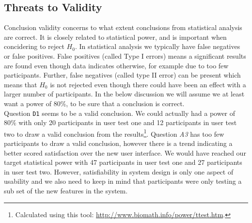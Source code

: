 

\subsection{Threats to Validity}
\label{sub-sec:user-test-validity}
Conclusion validity concerns to what extent conclusions from statistical analysis are correct. It is closely related to statistical power, and is important when concidering to reject $H_0$. In statistical analysis we typically have false negatives or false positives. False positives (called Type I errors) means a significant results are found even though data indicates otherwise, for example due to too few participants. Further, false negatives (called type II error) can be present which means that $H_0$ is not rejected even though there could have been an effect with a larger number of participants. In the below discussion we will assume we at least want a power of 80\%, to be sure that a conclusion is correct. \\

Question \texttt{D1} seems to be a valid conclusion. We could actually had a power of 80\% with only 20 participants in user test one and 12 participants in user test two to draw a valid conclusion from the results\footnote{Calculated using this tool: \url{http://www.biomath.info/power/ttest.htm}.}. Question \textit{A3} has too few participants to draw a valid conclusion, however there is a trend indicating a better scored satisfaction over the new user interface. We would have reached our target statistical power with 47 participants in user test one and 27 participants in user test two. However, satisfiability in system design is only one aspect of usability and we also need to keep in mind that participants were only testing a sub set of the new features in the system. \\

